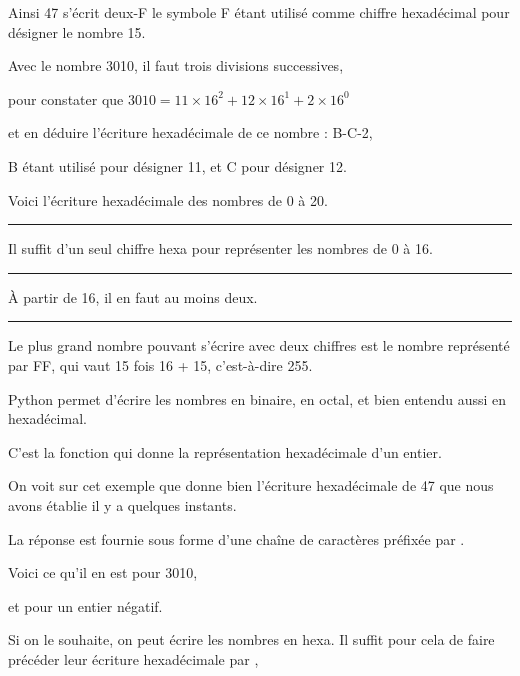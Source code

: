 \change


Ainsi 47 s'écrit deux-F le symbole F étant utilisé comme chiffre hexadécimal pour désigner le nombre 15.

\change
Avec le nombre 3010, il faut trois divisions successives,

\change
pour constater que $3010 = 11\times 16^2 +12\times 16^1 + 2\times 16^0$

\change
et en déduire l'écriture hexadécimale de ce nombre  : B-C-2,

B étant utilisé pour désigner 11, et C pour désigner 12.


\diapo %

Voici l'écriture hexadécimale des nombres de 0 à 20.

\hrule\medskip

Il suffit d'un seul chiffre hexa pour représenter les nombres de 0 à 16.

\hrule\medskip

À partir de 16, il en faut au moins deux.

\hrule\medskip

Le plus grand nombre pouvant s'écrire avec deux chiffres est le nombre représenté par FF, qui vaut 15 fois 16 + 15, c'est-à-dire 255.

\diapo %

Python permet d'écrire les nombres en binaire, en octal, et bien entendu aussi en hexadécimal.

\change
C'est la fonction  qui donne la représentation hexadécimale d'un entier.

\change

\change

On voit sur cet exemple que  donne bien l'écriture hexadécimale de 47 que nous avons établie il y a quelques instants.

La réponse est fournie sous forme d'une chaîne de caractères préfixée par .

\change

Voici ce qu'il en est pour 3010,

\change

et pour un entier négatif.

\change
Si on le souhaite, on peut écrire les nombres en hexa. Il suffit pour cela de faire précéder leur écriture hexadécimale par ,

